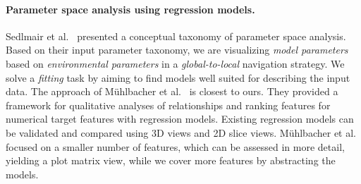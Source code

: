 \documentclass[journal]{style/vgtc} 			          %
\begin{document}
\paragraph{Parameter space analysis using regression models.}
Sedlmair et al.~\cite{Sedlmair} presented a conceptual taxonomy of parameter space analysis.
Based on their input parameter taxonomy, we are visualizing \emph{model parameters} based on \emph{environmental parameters} in a \emph{global-to-local} navigation strategy.
We solve a \emph{fitting} task by aiming to find models well suited for describing the input data.
The approach of M\"{u}hlbacher et al.~\cite{Muehlbacher} is closest to ours.
They provided a framework for qualitative analyses of relationships and ranking features for numerical target features with regression models.
Existing regression models can be validated and compared using 3D views and 2D slice views.
M\"{u}hlbacher et al. focused on a smaller number of features, which can be assessed in more detail, yielding a plot matrix view, while we cover more features by abstracting the models.
\end{document}
